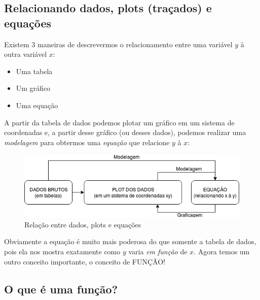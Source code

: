 \documentclass[pdftex, brazil, 12pt, twoside]{article}
\begin{document}
\subsection{Relacionando dados, plots (traçados) e equações}
\label{funcoes-graficos-relacionando}

Existem 3 maneiras de descrevermos o relacionamento entre uma variável $y$ à
outra variável $x$:

\begin{itemize}[noitemsep]
\item Uma tabela
\item Um gráfico
\item Uma equação
\end{itemize}

A partir da tabela de dados podemos plotar um gráfico em um sistema de coordenadas
e, a partir desse gráfico (ou desses dados), podemos realizar uma \emph{modelagem}
para obtermos uma \emph{equação} que relacione $y$ à $x$:

\begin{figure}[ht]
  \begin{center}
    \caption{Relação entre dados, plots e equações}
    \label{fig:relacao-dados-plots-equacoes}
    \includegraphics[scale=0.7]{imagens/relacao_dados_plot_equacao.png}
    
  \end{center}
\end{figure}

Obviamente a equação é muito mais poderosa do que somente a tabela de dados, pois
ela nos mostra exatamente como $y$ varia \emph{em função} de $x$. Agora temos
um outro conceito importante, o conceito de FUNÇÃO!


\subsection{O que é uma função?}
\label{funcoes-conceito}
\end{document}
